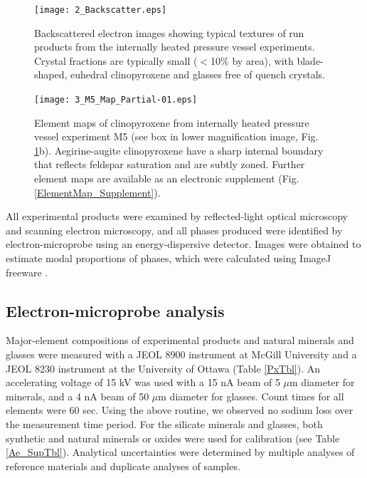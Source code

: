 \documentclass[review,authoryear,12pt]{elsarticle}
\begin{document}
\begin{figure}[tb]
        \begin{center}
        \texttt{[image: 2\_Backscatter.eps]}
        \caption[Backscattered electron images showing typical textures of run products from the internally heated pressure vessel experiments]{Backscattered electron images showing typical textures of run products from the internally heated pressure vessel experiments. Crystal fractions are typically small ($<$10\% by area), with blade-shaped, euhedral clinopyroxene and glasses free of quench crystals.}
        \label{1_BSE}
        \end{center}
        \end{figure}
        
        
        \begin{figure}[tb]
        \begin{center}
        \texttt{[image: 3\_M5\_Map\_Partial-01.eps]}
        \caption[Element maps of a clinopyroxene from internally heated pressure vessel experiment M5]{Element maps of clinopyroxene from internally heated pressure vessel experiment M5 (see box in lower magnification image, Fig. \ref{1_BSE}b). Aegirine-augite clinopyroxene have a sharp internal boundary that reflects feldspar saturation and are subtly zoned. Further element maps are available as an electronic supplement (Fig. \ref{ElementMap_Supplement}).}
        \label{2_Elementmap}
        \end{center}
        \end{figure}

All experimental products were examined by reflected-light optical microscopy and scanning electron microscopy, and all phases produced were identified by electron-microprobe using an energy-dispersive detector. Images were obtained to estimate modal proportions of phases, which were calculated using ImageJ freeware \citep[][see Table \ref{Ae_SupTbl}]{Rasband2016}.

\subsection{Electron-microprobe analysis}
Major-element compositions of experimental products and natural minerals and glasses were measured with a JEOL 8900 instrument at McGill University and a JEOL 8230 instrument at the University of Ottawa (Table \ref{PxTbl}). An accelerating voltage of 15 kV was used with a 15 nA beam of 5 $\mu$m diameter for minerals, and a 4 nA beam of 50 $\mu$m diameter for glasses. Count times for all elements were 60 sec. Using the above routine, we observed no sodium loss over the measurement time period.
For the silicate minerals and glasses, both synthetic and natural minerals or oxides were used for calibration (see Table \ref{Ae_SupTbl}). Analytical uncertainties were determined by multiple analyses of reference materials and duplicate analyses of samples. 
\end{document}
